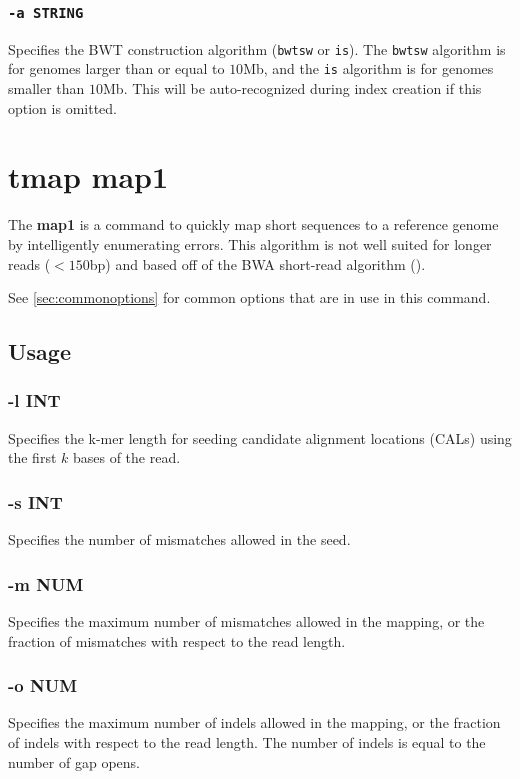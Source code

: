\documentclass[a4paper,12pt]{book}
\newcommand{\TT}[1]{{\tt #1}} %
\newcommand{\BF}[1]{{\bf #1}} %
\begin{document}
\subsubsection{\TT{-a STRING}}
Specifies the BWT construction algorithm (\TT{bwtsw} or \TT{is}).
The \TT{bwtsw} algorithm is for genomes larger than or equal to $10$Mb, and the \TT{is} algorithm is for genomes smaller than $10$Mb.
This will be auto-recognized during index creation if this option is omitted.

\section{tmap map1}
\label{sec:map1}
The \BF{map1} is a command to quickly map short sequences to a reference genome by intelligently enumerating errors.
This algorithm is not well suited for longer reads ($<150$bp) and based off of the BWA short-read algorithm (\cite{BWA-short}).

See \autoref{sec:commonoptions} for common options that are in use in this command.

\subsection{Usage}

\subsubsection{-l INT}
Specifies the k-mer length for seeding candidate alignment locations (CALs) using the first $k$ bases of the read.

\subsubsection{-s INT}
Specifies the number of mismatches allowed in the seed.

\subsubsection{-m NUM}
Specifies the maximum number of mismatches allowed in the mapping, or the fraction of mismatches with respect to the read length.

\subsubsection{-o NUM}
Specifies the maximum number of indels allowed in the mapping, or the fraction of indels with respect to the read length.
The number of indels is equal to the number of gap opens.
\end{document}
